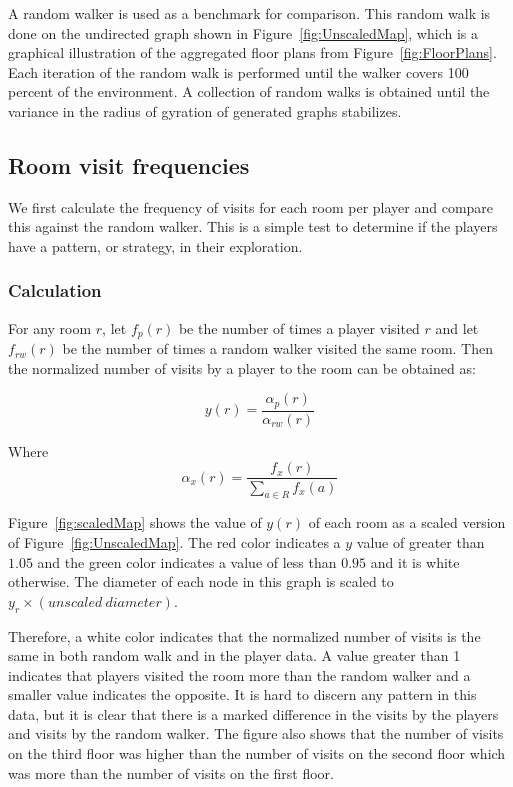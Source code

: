 A random walker is used as a benchmark for comparison. This random walk is done on the undirected graph shown in Figure~\ref{fig:UnscaledMap}, which is a graphical illustration of the aggregated floor plans from Figure~\ref{fig:FloorPlans}. Each iteration of the random walk is performed until the walker covers 100 percent of the environment. A collection of random walks is obtained until the variance in the radius of gyration of generated graphs stabilizes.


\subsection{Room visit frequencies}


We first calculate the frequency of visits for each room per player and compare this against the random walker. This is a simple test to determine if the players have a pattern, or strategy, in their exploration.

\subsubsection{Calculation}


For any room $r$, let $f_p(r)$ be the number of times a player visited $r$ and let $f_{rw}(r)$ be the number of times a random walker visited the same room. Then the normalized number of visits by a player to the room can be obtained as:

\begin{equation}
y(r) = \frac{\alpha_p(r)}{\alpha_{rw}(r)}
\label{eq:y_equation}
\end{equation}

Where
\begin{equation}
\alpha_x(r) = \frac{f_x(r)}{\sum_{a \in R} f_x(a)}
\end{equation}

Figure~\ref{fig:scaledMap} shows the value of $y(r)$ of each room as a scaled version of Figure~\ref{fig:UnscaledMap}. The red color indicates a $y$ value of greater than $1.05$ and the green color indicates a value of less than $0.95$ and it is white otherwise. The diameter of each node in this graph is scaled to $y_r \times (unscaled\ diameter)$.


Therefore, a white color indicates that the normalized number of visits is the same in both random walk and in the player data. A value greater than 1 indicates that players visited the room more than the random walker and a smaller value indicates the opposite. It is hard to discern any pattern in this data, but it is clear that there is a marked difference in the visits by the players and visits by the random walker. The figure also shows that the number of visits on the third floor was higher than the number of visits on the second floor which was more than the number of visits on the first floor.


